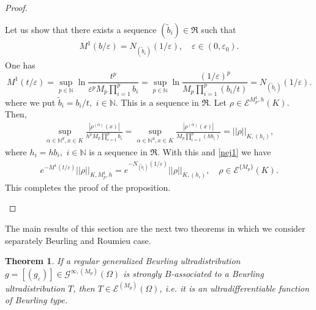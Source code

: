 \documentclass[sn-mathphys,Numbered]{sn-jnl}%
\theoremstyle{thmstyleone}%
\newtheorem{theorem}{Theorem}%
\theoremstyle{thmstyletwo}%
\theoremstyle{thmstylethree}%
\begin{document}
\begin{proof}
\begin{enumerate}
Let us show that there exists a  sequence $(\tilde b_i)\in\mathfrak R$ such that 
\begin{align*}
 M^1(b/\varepsilon)=N_{(\tilde b_i)}(1/\varepsilon), \quad \varepsilon\in(0,\varepsilon_0).
\end{align*}
One has 
\begin{equation}\label{nej1} 
M^1(t/\varepsilon)=\sup_{p\in\mathbb N}\ln \frac{t^p}{\varepsilon^p M_p\prod_{i=1}^pb_i}=\sup_{p\in\mathbb N}\ln \frac{(1/\varepsilon)^p}{ M_p\prod_{i=1}^p(b_i/t)}=N_{(\tilde b_i)}(1/\varepsilon).
\end{equation}
where we put $\tilde b_i=b_i/t, $ $i\in\mathbb N.$  This is a sequence in $\mathfrak R.$ Let $\rho\in\mathcal E^{M^1_p,h}(K).$ Then,
\begin{align*}
\sup_{\alpha\in\mathbb N^d, x\in K}\frac{|\rho^{(\alpha)}(x)|}{h^pM_p\prod_{i=1}^pb_i}=\sup_{\alpha\in\mathbb N^d, x\in K}\frac{|\rho^{(\alpha)}(x)|}{M_p\prod_{i=1}^p(hb_i)}= ||\rho||_{K,(h_i)},
\end{align*}
where $h_i=hb_i, $ $i\in\mathbb N$ is a sequence in $\mathfrak{R}. $ With this and \eqref{nej1} we have 
\begin{align*}
e^{-M^1(t/\varepsilon)}||\rho||_{K,M_p^1,h}= e^{-N_{(\tilde b_i)}(1/\varepsilon)}||\rho||_{K,(h_i)}, \quad \rho\in\mathcal E^{\{M_p\}}(K).
\end{align*}
This completes the proof of the proposition.
\qedhere
\end{enumerate}
\end{proof}



The main results of this section are the  next two theorems in which we consider separately Beurling and Roumieu case.

\begin{theorem}\label{b-theorem}
If a regular generalized Beurling  ultradistribution $g=[(g_\varepsilon)]\in\mathcal G^{\infty,(M_p)}(\Omega)$ is strongly $B$-associated to a Beurling  ultradistribution $T$, then $T\in \mathcal E^{(M_p)}(\Omega)$,  i.e.  it is an ultradifferentiable function of Beurling type.
\end{theorem}
\end{document}

